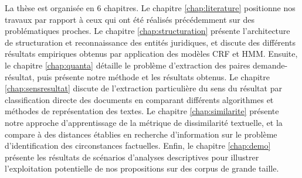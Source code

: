 La thèse est organisée en 6 chapitres. Le chapitre \ref{chap:literature} positionne nos travaux par rapport à ceux qui ont été réalisés précédemment sur des problématiques proches. Le chapitre \ref{chap:structuration} présente l'architecture de structuration et reconnaissance des entités juridiques, et discute des différents résultats empiriques obtenus par application des modèles CRF et HMM. Ensuite, le chapitre \ref{chap:quanta} détaille le problème  d'extraction des paires demande-résultat, puis présente  notre méthode et les résultats obtenus. Le chapitre \ref{chap:sensresultat} discute de l'extraction particulière du sens du résultat par classification directe des documents en comparant différents algorithmes et méthodes de représentation des textes. Le chapitre \ref{chap:similarite} présente notre approche d'apprentissage de la métrique de dissimilarité textuelle, et la compare à des distances établies en recherche d'information sur le problème d'identification des circonstances factuelles. Enfin, le chapitre \ref{chap:demo} présente les résultats de scénarios d'analyses descriptives pour illustrer l'exploitation potentielle de nos propositions sur des corpus de grande taille. 
